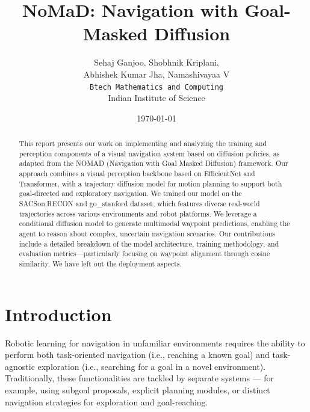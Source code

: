 \documentclass[12pt]{article}
\title{NoMaD: \textbf{N}avigati\textbf{o}n with Goal-\textbf{Ma}sked \textbf{D}iffusion}
\author{Sehaj Ganjoo, Shobhnik Kriplani, \\ Abhishek Kumar Jha, Namashivayaa V \\ \texttt{Btech Mathematics and Computing} \\ Indian Institute of Science}
\date{\today}
\begin{document}
\maketitle

\begin{abstract}
This report presents our work on implementing and analyzing the training and perception components of a visual navigation system based on diffusion policies, as adapted from the NOMAD (Navigation with Goal Masked Diffusion) framework. 
Our approach combines a visual perception backbone based on EfficientNet and Transformer, with a trajectory diffusion model for motion planning to support both goal-directed and exploratory navigation. We trained our model on the SACSon,RECON and go\_stanford dataset, which features diverse real-world trajectories across various environments and robot platforms. 
We leverage a conditional diffusion model to generate multimodal waypoint predictions, enabling the agent to reason about complex, uncertain navigation scenarios. Our contributions include a detailed breakdown of the model architecture, training methodology, and evaluation metrics—particularly focusing on waypoint alignment through cosine similarity. 
We have left out the deployment aspects.
\end{abstract}

\section{Introduction}
Robotic learning for navigation in unfamiliar environments requires the ability to perform both task-oriented navigation (i.e., reaching a known goal) and task-agnostic exploration (i.e., searching for a goal in a novel environment). Traditionally, these functionalities are tackled by separate systems — for example, using subgoal proposals, explicit planning modules, or distinct navigation strategies for exploration and goal-reaching.
\end{document}
